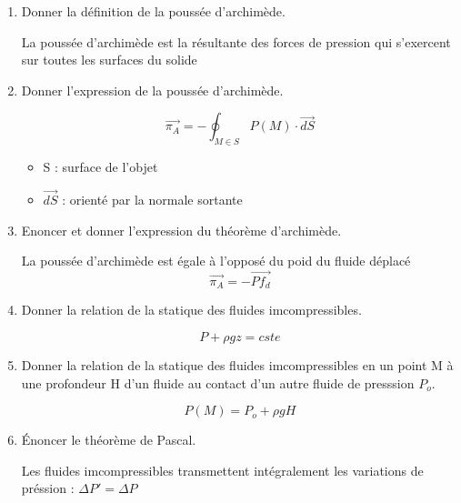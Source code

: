 \begin{enumerate}[label=\arabic{enumi} - , left=0pt, itemsep=1em]
\begin{solution}
           \end{solution}
     
    \item Donner la définition de la poussée d'archimède. \par
    \begin{solution}
        La poussée d'archimède est la résultante des forces de pression qui s'exercent sur toutes les surfaces du solide 
     \end{solution}

     \item Donner l'expression de la poussée d'archimède. \par
     \begin{solution}
         \[ \vec{\pi_A} = -\oint_{M \in S} P(M) \cdot \vec{dS} \]
         \begin{itemize}
          \tiny\item   S : surface de l'objet
          \tiny\item   $\vec{dS}$ : orienté par la normale sortante
      \end{itemize}  
      \end{solution}

      \item Enoncer et donner l'expression du théorème d'archimède. \par
      \begin{solution}
          La poussée d'archimède est égale à l'opposé du poid du fluide déplacé
          \[\vec{\pi_A} = - \overrightarrow{Pf_d} \] 
       \end{solution}

       \item Donner la relation de la statique des fluides imcompressibles. \par
       \begin{solution}
          \[ P + \rho g z = cste\]
        \end{solution}

        \item Donner la relation de la statique des fluides imcompressibles en un point M à une profondeur H d'un fluide au contact d'un autre fluide de presssion $P_o$. \par
        \begin{solution}
           \[P(M) = P_o + \rho g H\]
           
         \end{solution}

         \item Énoncer le théorème de Pascal. \par
         \begin{solution}
            Les fluides imcompressibles transmettent intégralement les variations de préssion : $\Delta P' = \Delta P $
            

\end{solution}
\end{enumerate}
